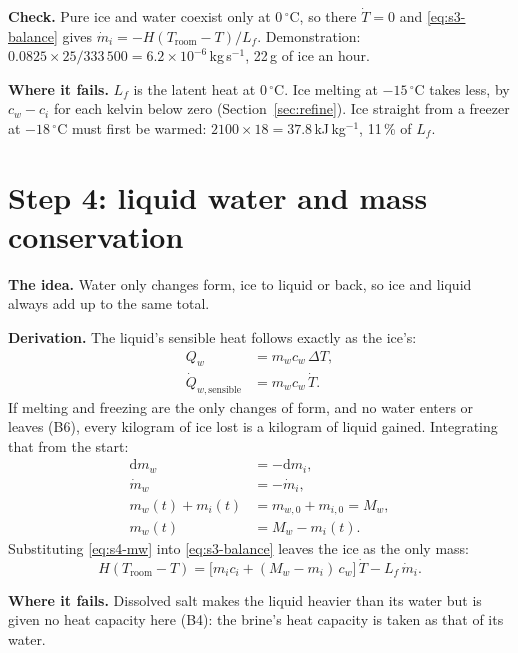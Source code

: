 \documentclass[11pt,a4paper]{article}
\newcommand{\dd}{\mathrm{d}}
\newcommand{\dC}{\,{}^{\circ}\mathrm{C}}
\newcommand{\Troom}{T_{\mathrm{room}}}
\newcommand{\para}[1]{\par\smallskip\noindent\textbf{#1}\enspace}
\begin{document}
\para{Check.} Pure ice and water coexist only at $0\dC$, so there $\dot T = 0$ and \eqref{eq:s3-balance}
gives $\dot m_i = -H(\Troom - T)/L_f$. Demonstration: $0.0825\times25/333\,500 = 6.2\times10^{-6}$\,kg\,s$^{-1}$,
22\,g of ice an hour.

\para{Where it fails.} $L_f$ is the latent heat at $0\dC$. Ice melting at $-15\dC$ takes less, by
$c_w - c_i$ for each kelvin below zero (Section~\ref{sec:refine}). Ice straight from a freezer at $-18\dC$
must first be warmed: $2100\times18 = 37.8$\,kJ\,kg$^{-1}$, 11\,\% of $L_f$.

\section{Step 4: liquid water and mass conservation}\label{sec:s4}

\para{The idea.} Water only changes form, ice to liquid or back, so ice and liquid always add up to the same
total.

\para{Derivation.} The liquid's sensible heat follows exactly as the ice's:
\begin{align}
Q_w &= m_wc_w\,\Delta T, \label{eq:s4-Qw}\\
\dot Q_{w,\mathrm{sensible}} &= m_wc_w\,\dot T . \label{eq:s4-Qwdot}
\end{align}
If melting and freezing are the only changes of form, and no water enters or leaves (B6), every kilogram of
ice lost is a kilogram of liquid gained. Integrating that from the start:
\begin{align}
\dd m_w &= -\dd m_i, \label{eq:s4-dm}\\
\dot m_w &= -\dot m_i, \label{eq:s4-mdot}\\
m_w(t) + m_i(t) &= m_{w,0} + m_{i,0} = M_w, \label{eq:s4-total}\\
m_w(t) &= M_w - m_i(t). \label{eq:s4-mw}
\end{align}
Substituting \eqref{eq:s4-mw} into \eqref{eq:s3-balance} leaves the ice as the only mass:
\begin{equation}
H(\Troom - T) = \big[m_ic_i + (M_w - m_i)\,c_w\big]\,\dot T - L_f\,\dot m_i . \label{eq:s4-balance}
\end{equation}

\para{Where it fails.} Dissolved salt makes the liquid heavier than its water but is given no heat
capacity here (B4): the brine's heat capacity is taken as that of its water.

\end{document}
